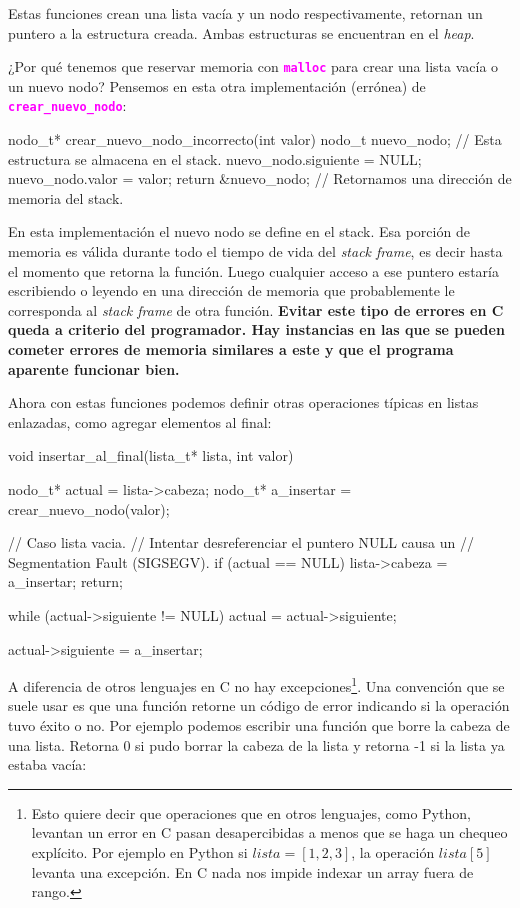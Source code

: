\documentclass[]{scrartcl}
\newcommand{\hl}[1]{\textcolor{magenta}{\textbf{\texttt{#1}}}}
\begin{document}
Estas funciones crean una lista vacía y un nodo respectivamente, retornan un puntero a la estructura creada. Ambas estructuras se encuentran en el \textit{heap}.

¿Por qué tenemos que reservar memoria con \hl{malloc} para crear una lista vacía o un nuevo nodo? Pensemos en esta otra implementación (errónea) de \hl{crear\_nuevo\_nodo}:

\begin{cbox}[unbreakable]{}
nodo_t* crear_nuevo_nodo_incorrecto(int valor) {
    nodo_t nuevo_nodo; // Esta estructura se almacena en el stack.
    nuevo_nodo.siguiente = NULL;
    nuevo_nodo.valor = valor;
    return &nuevo_nodo; // Retornamos una dirección de memoria del stack.
}
\end{cbox}

En esta implementación el nuevo nodo se define en el stack. Esa porción de memoria es válida durante todo el tiempo de vida del \textit{stack frame}, es decir hasta el momento que retorna la función. Luego cualquier acceso a ese puntero estaría escribiendo o leyendo en una dirección de memoria que probablemente le corresponda al \textit{stack frame} de otra función. \textbf{Evitar este tipo de errores en C queda a criterio del programador. Hay instancias en las que se pueden cometer errores de memoria similares a este y que el programa aparente funcionar bien.}

Ahora con estas funciones podemos definir otras operaciones típicas en listas enlazadas, como agregar elementos al final:

\begin{cbox}[unbreakable]{}
void insertar_al_final(lista_t* lista, int valor) {
    nodo_t* actual = lista->cabeza;
    nodo_t* a_insertar = crear_nuevo_nodo(valor);

    // Caso lista vacia. 
    // Intentar desreferenciar el puntero NULL causa un 
    // Segmentation Fault (SIGSEGV).
    if (actual == NULL) {
        lista->cabeza = a_insertar;
        return;
    }

    while (actual->siguiente != NULL)
        actual = actual->siguiente;

    actual->siguiente = a_insertar;
}
\end{cbox}

A diferencia de otros lenguajes en C no hay excepciones\footnote{Esto quiere decir que operaciones que en otros lenguajes, como Python, levantan un error en C pasan desapercibidas a menos que se haga un chequeo explícito. Por ejemplo en Python si $lista = [1,2,3]$, la operación $lista[5]$ levanta una excepción. En C nada nos impide indexar un array fuera de rango.}. Una convención que se suele usar es que una función retorne un código de error indicando si la operación tuvo éxito o no. Por ejemplo podemos escribir una función que borre la cabeza de una lista. Retorna 0 si pudo borrar la cabeza de la lista y retorna -1 si la lista ya estaba vacía:
\end{document}
